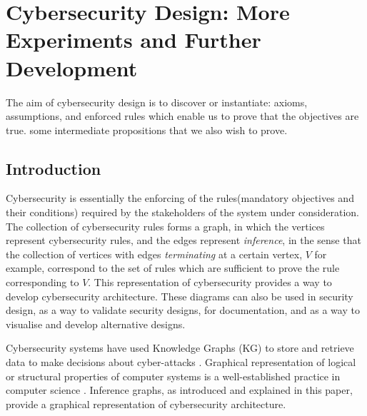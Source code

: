\chapter{Cybersecurity Design: More Experiments and Further Development}
The aim of cybersecurity design is to discover or instantiate:
axioms, assumptions, and enforced rules which enable us to
prove that the objectives are true.
some intermediate propositions that we also wish to prove.

\section{Introduction}\label{introsec} \thispagestyle{empty}
Cybersecurity is essentially the enforcing of the rules(mandatory objectives and their conditions) required by the stakeholders of the system under consideration.  The collection of cybersecurity rules forms a graph, in which the vertices represent cybersecurity rules, and the edges represent {\em inference}, in the sense that the collection of vertices with edges {\em terminating} at a certain vertex, $V$ for example, correspond to the set of rules which are sufficient to prove the rule corresponding to $V$. This representation of cybersecurity provides a way to develop cybersecurity architecture\cite{Rerup2018}. These diagrams can also be used in security design, as a way to validate security designs, for documentation, and as a way to visualise and develop alternative designs.

Cybersecurity systems have used Knowledge Graphs (KG) to store and  retrieve data  to make decisions about cyber-attacks 
\cite{pingle2019relext,jia2018practical, ghose2019multimodal, deng2019knowledge}. Graphical representation of logical or structural properties of computer systems is a well-established practice in computer science \cite{engelen2010integrating}. Inference graphs, as introduced and explained in this paper, provide a graphical representation of cybersecurity architecture.

